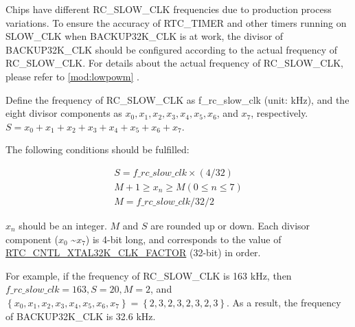 \documentclass[main\_\_EN.tex]{subfiles}
\begin{document}
Chips have different RC\_SLOW\_CLK frequencies due to production process variations. To ensure the accuracy of RTC\_TIMER and other timers running on SLOW\_CLK when BACKUP32K\_CLK is at work, the divisor of BACKUP32K\_CLK should be configured according to the actual frequency of RC\_SLOW\_CLK. For details about the actual frequency of RC\_SLOW\_CLK, please refer to \ref{mod:lowpowm} \textit{}.

Define the frequency of RC\_SLOW\_CLK as f\_rc\_slow\_clk (unit: kHz), and the eight divisor components as \begin{math} x_0, x_1, x_2, x_3, x_4, x_5, x_6 \end{math}, and \begin{math}x_7\end{math}, respectively. \begin{math}S = x_0 + x_1 + x_2 + x_3 + x_4 + x_5 + x_6 + x_7\end{math}.

The following conditions should be fulfilled:

    \begin{gather*}
    S = f\_rc\_slow\_clk \times (4/32)\\
    M + 1 \geq x_n \geq M (0 \leq n \leq 7)\\
    M = f\_rc\_slow\_clk/32/2
    \end{gather*}
    
\begin{math}x_n\end{math} should be an integer. \begin{math}M\end{math} and \begin{math}S\end{math} are rounded up or down. Each divisor component (\begin{math}x_0\end{math} \textasciitilde \begin{math}x_7\end{math}) is 4-bit long, and corresponds to the value of \hyperref[fielddesc:RTCCNTLXTAL32KCLKFACTOR]{RTC\_CNTL\_XTAL32K\_CLK\_FACTOR} (32-bit) in order.

For example, if the frequency of RC\_SLOW\_CLK is 163 kHz, then \begin{math} f\_rc\_slow\_clk = 163, S = 20, M = 2 \end{math}, and \begin{math} \left\{x_0, x_1, x_2, x_3, x_4, x_5, x_6, x_7\right\} = \left\{2, 3, 2, 3, 2, 3, 2, 3\right\}\end{math}. As a result, the frequency of BACKUP32K\_CLK is 32.6 kHz.
\end{document}
